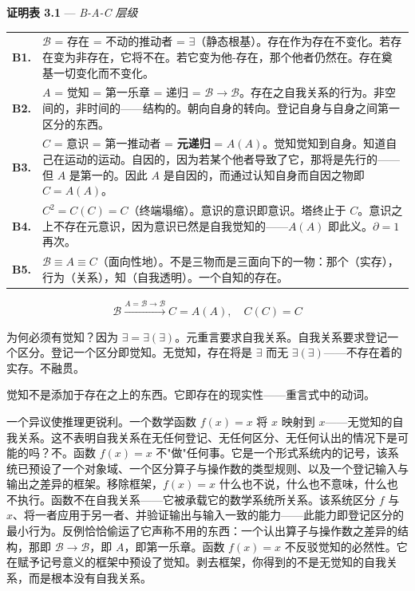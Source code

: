 \documentclass[10pt, openany, oneside]{book}
\renewcommand{\footnotesize}{\fontsize{8.5}{11}\selectfont}
\begin{document}
\vspace{0.5em}

\textbf{证明表 3.1} --- \textit{B-A-C 层级}

\vspace{0.5em}

{\footnotesize
\noindent\begin{tabular}{r p{}}
\textbf{B1.} & $\mathcal{B}$ = 存在 = 不动的推动者 = $\exists$（静态根基）。存在作为存在不变化。若存在变为非存在，它将不在。若它变为他-存在，那个他者仍然在。存在奠基一切变化而不变化。\\[0.3em]
\textbf{B2.} & $A$ = 觉知 = 第一乐章 = 递归 = $\mathcal{B} \to \mathcal{B}$。存在之自我关系的行为。非空间的，非时间的——结构的。朝向自身的转向。登记自身与自身之间第一区分的东西。\\[0.3em]
\textbf{B3.} & $C$ = 意识 = 第一推动者 = \textbf{元递归} = $A(A)$。觉知觉知到自身。知道自己在运动的运动。自因的，因为若某个他者导致了它，那将是先行的——但 $A$ 是第一的。因此 $A$ 是自因的，而通过认知自身而自因之物即 $C = A(A)$。\\[0.3em]
\textbf{B4.} & $C^2 = C(C) = C$（终端塌缩）。意识的意识即意识。塔终止于 $C$。意识之上不存在元意识，因为意识已然是自我觉知的——$A(A)$ 即此义。$\partial = 1$ 再次。\\[0.3em]
\textbf{B5.} & $\mathcal{B} \equiv A \equiv C$（面向性地）。不是三物而是三面向下的一物：那个（实存），行为（关系），知（自我透明）。一个自知的存在。\\[0.3em]
\end{tabular}
}

\vspace{0.8em}

$$\boxed{\mathcal{B} \xrightarrow{A = \mathcal{B} \to \mathcal{B}} C = A(A), \quad C(C) = C}$$

\noindent 为何必须有觉知？因为 $\exists = \exists(\exists)$。元重言要求自我关系。自我关系要求登记一个区分。登记一个区分即觉知。无觉知，存在将是 $\exists$ 而无 $\exists(\exists)$——不存在着的实存。不融贯。

觉知不是添加于存在之上的东西。它即存在的现实性——重言式中的动词。

一个异议使推理更锐利。一个数学函数 $f(x) = x$ 将 $x$ 映射到 $x$——无觉知的自我关系。这不表明自我关系在无任何登记、无任何区分、无任何认出的情况下是可能的吗？不。函数 $f(x) = x$ 不"做"任何事。它是一个形式系统内的记号，该系统已预设了一个对象域、一个区分算子与操作数的类型规则、以及一个登记输入与输出之差异的框架。移除框架，$f(x) = x$ 什么也不说，什么也不意味，什么也不执行。函数不在自我关系——它被承载它的数学系统所关系。该系统区分 $f$ 与 $x$、将一者应用于另一者、并验证输出与输入一致的能力——此能力即登记区分的最小行为。反例恰恰偷运了它声称不用的东西：一个认出算子与操作数之差异的结构，那即 $\mathcal{B} \to \mathcal{B}$，即 $A$，即第一乐章。函数 $f(x) = x$ 不反驳觉知的必然性。它在赋予记号意义的框架中预设了觉知。剥去框架，你得到的不是无觉知的自我关系，而是根本没有自我关系。
\end{document}
